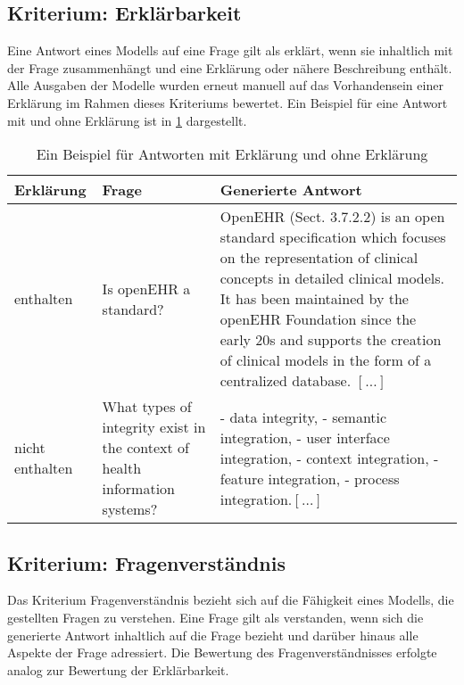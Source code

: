 \subsection{Kriterium: Erklärbarkeit}
Eine Antwort eines Modells auf eine Frage gilt als erklärt, wenn sie inhaltlich mit der Frage zusammenhängt und eine Erklärung oder nähere Beschreibung enthält.
Alle Ausgaben der Modelle wurden erneut manuell auf das Vorhandensein einer Erklärung im Rahmen dieses Kriteriums bewertet.
Ein Beispiel für eine Antwort mit und ohne Erklärung ist in \cref{tab:explanation} dargestellt.
\begin{table}
    \begin{tabularx}{\textwidth}{p{2.8cm}p{3cm}X}
        \toprule
        \textbf{Erklärung} & \textbf{Frage} & \textbf{Generierte Antwort} \\
        \midrule
        enthalten & Is openEHR a standard? & OpenEHR (Sect. 3.7.2.2) is an open standard specification which focuses on the representation of clinical concepts in detailed clinical models.\newline
        It has been maintained by the openEHR Foundation since the early 20s and supports the creation of clinical models in the form of a centralized database. $[\dots]$ \\
        nicht enthalten & What types of integrity exist in the context of health information systems? & - data integrity,\newline
         - semantic integration,\newline 
         - user interface integration,\newline 
         - context integration,\newline
         - feature integration,\newline 
         - process integration.$[\dots]$ \\
        \bottomrule
    \end{tabularx}
    \caption[Beispiele der Erklärbarkeit]{Ein Beispiel für Antworten mit Erklärung und ohne Erklärung}\label{tab:explanation}
\end{table}

\subsection{Kriterium: Fragenverständnis}
Das Kriterium Fragenverständnis bezieht sich auf die Fähigkeit eines Modells, die gestellten Fragen zu verstehen.
Eine Frage gilt als verstanden, wenn sich die generierte Antwort inhaltlich auf die Frage bezieht und darüber hinaus alle Aspekte der Frage adressiert.
Die Bewertung des Fragenverständnisses erfolgte analog zur Bewertung der Erklärbarkeit.


